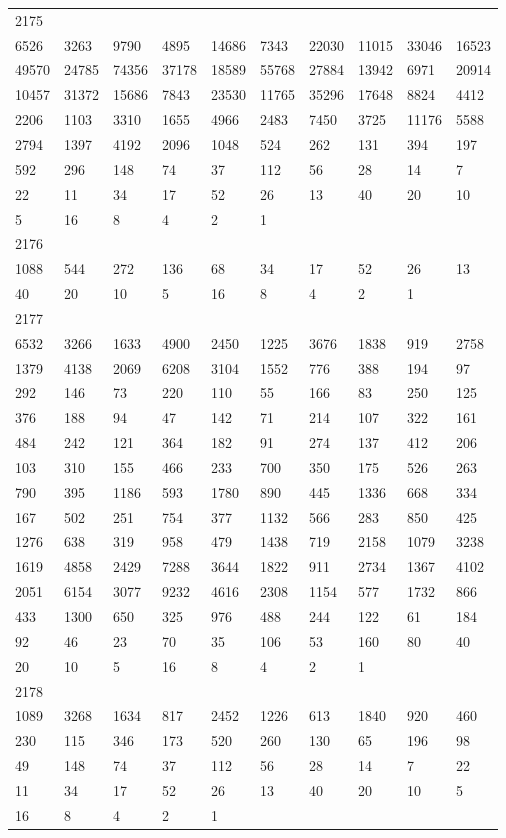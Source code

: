 \begin{longtable}{*{10}{l}}
2175&&&&&&&&&\\
6526& 3263& 9790& 4895& 14686& 7343& 22030& 11015& 33046& 16523\\
49570& 24785& 74356& 37178& 18589& 55768& 27884& 13942& 6971& 20914\\
10457& 31372& 15686& 7843& 23530& 11765& 35296& 17648& 8824& 4412\\
2206& 1103& 3310& 1655& 4966& 2483& 7450& 3725& 11176& 5588\\
2794& 1397& 4192& 2096& 1048& 524& 262& 131& 394& 197\\
592& 296& 148& 74& 37& 112& 56& 28& 14& 7\\
22& 11& 34& 17& 52& 26& 13& 40& 20& 10\\
5& 16& 8& 4& 2& 1& \\

2176&&&&&&&&&\\
1088& 544& 272& 136& 68& 34& 17& 52& 26& 13\\
40& 20& 10& 5& 16& 8& 4& 2& 1& \\

2177&&&&&&&&&\\
6532& 3266& 1633& 4900& 2450& 1225& 3676& 1838& 919& 2758\\
1379& 4138& 2069& 6208& 3104& 1552& 776& 388& 194& 97\\
292& 146& 73& 220& 110& 55& 166& 83& 250& 125\\
376& 188& 94& 47& 142& 71& 214& 107& 322& 161\\
484& 242& 121& 364& 182& 91& 274& 137& 412& 206\\
103& 310& 155& 466& 233& 700& 350& 175& 526& 263\\
790& 395& 1186& 593& 1780& 890& 445& 1336& 668& 334\\
167& 502& 251& 754& 377& 1132& 566& 283& 850& 425\\
1276& 638& 319& 958& 479& 1438& 719& 2158& 1079& 3238\\
1619& 4858& 2429& 7288& 3644& 1822& 911& 2734& 1367& 4102\\
2051& 6154& 3077& 9232& 4616& 2308& 1154& 577& 1732& 866\\
433& 1300& 650& 325& 976& 488& 244& 122& 61& 184\\
92& 46& 23& 70& 35& 106& 53& 160& 80& 40\\
20& 10& 5& 16& 8& 4& 2& 1& \\

2178&&&&&&&&&\\
1089& 3268& 1634& 817& 2452& 1226& 613& 1840& 920& 460\\
230& 115& 346& 173& 520& 260& 130& 65& 196& 98\\
49& 148& 74& 37& 112& 56& 28& 14& 7& 22\\
11& 34& 17& 52& 26& 13& 40& 20& 10& 5\\
16& 8& 4& 2& 1& \\


\end{longtable}
